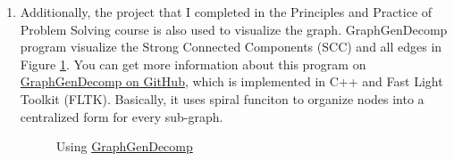 \documentclass[12pt,a4paper]{article}
\makeatletter
\newtheorem*{solution}{Solution}
\theoremstyle{definition}
\renewenvironment{solution}[1][Solution] {\par\pushQED{\qed}\normalfont\topsep6\p@\@plus6\p@\relax\trivlist\item[\hskip\labelsep\bfseries#1\@addpunct{.}]\ignorespaces}{\popQED\endtrivlist\@endpefalse} \makeatother
\makeatother
\begin{document}
\begin{enumerate}
\begin{enumerate}
\begin{solution}
            Additionally, the project that I completed in the Principles and Practice of Problem Solving course is also used to visualize the graph. GraphGenDecomp program visualize the Strong Connected Components (SCC) and all edges in Figure \ref{fig:ggd}. You can get more information about this program on \href{https://github.com/LogCreative/GraphGenDecomp/blob/master/report/GraphGenDecomp.pdf}{GraphGenDecomp on GitHub}, which is implemented in C++ and Fast Light Toolkit (FLTK). Basically, it uses spiral funciton to organize nodes into a centralized form for every sub-graph.
            \begin{figure}[h]
                \caption{Using \href{https://github.com/LogCreative/GraphGenDecomp}{GraphGenDecomp}}
                \label{fig:ggd}
            \end{figure}
            
        \end{solution}
    \end{enumerate}	
\end{enumerate}
\end{document}
